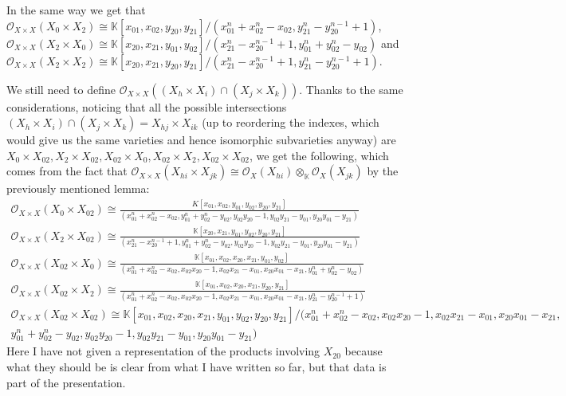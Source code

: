 \documentclass{article}
\newcommand{\numberset}{\mathbb}
\newcommand{\K}{\numberset{K}}
\begin{document}
In the same way we get that $\mathcal{O}_{X\times X}(X_0\times X_2)\cong\K[x_{01},x_{02},y_{20},y_{21}]/(x_{01}^n+x_{02}^n-x_{02},y_{21}^n-y_{20}^{n-1}+1)$, $\mathcal{O}_{X\times X}(X_2\times X_0)\cong\K[x_{20},x_{21},y_{01},y_{02}]/(x_{21}^n-x_{20}^{n-1}+1,y_{01}^n+y_{02}^n-y_{02})$ and $\mathcal{O}_{X\times X}(X_2\times X_2)\cong\K[x_{20},x_{21},y_{20},y_{21}]/(x_{21}^n-x_{20}^{n-1}+1,y_{21}^n-y_{20}^{n-1}+1)$.

We still need to define $\mathcal{O}_{X\times X}((X_h\times X_i)\cap(X_j\times X_k))$. Thanks to the same considerations, noticing that all the possible intersections $(X_h\times X_i)\cap(X_j\times X_k)=X_{hj}\times X_{ik}$ (up to reordering the indexes, which would give us the same varieties and hence isomorphic subvarieties anyway) are $X_0\times X_{02},X_2\times X_{02},X_{02}\times X_0,X_{02}\times X_2,X_{02}\times X_{02}$, we get the following, which comes from the fact that $\mathcal{O}_{X\times X}(X_{hi}\times X_{jk})\cong\mathcal{O}_X(X_{hi})\otimes_{\K}\mathcal{O}_X(X_{jk})$ by the previously mentioned lemma:
\begin{align*}
  \mathcal{O}_{X\times X}(X_0\times X_{02})\cong\frac{K[x_{01},x_{02},y_{01},y_{02},y_{20},y_{21}]}{(x_{01}^n+x_{02}^n-x_{02},y_{01}^n+y_{02}^n-y_{02},y_{02}y_{20}-1,y_{02}y_{21}-y_{01},y_{20}y_{01}-y_{21})} \\
  \mathcal{O}_{X\times X}(X_2\times X_{02})\cong\frac{\K[x_{20},x_{21},y_{01},y_{02},y_{20},y_{21}]}{(x_{21}^n-x_{20}^{n-1}+1,y_{01}^n+y_{02}^n-y_{02},y_{02}y_{20}-1,y_{02}y_{21}-y_{01},y_{20}y_{01}-y_{21})} \\
  \mathcal{O}_{X\times X}(X_{02}\times X_0)\cong\frac{\K[x_{01},x_{02},x_{20},x_{21},y_{01},y_{02}]}{(x_{01}^n+x_{02}^n-x_{02},x_{02}x_{20}-1,x_{02}x_{21}-x_{01},x_{20}x_{01}-x_{21},y_{01}^n+y_{02}^n-y_{02})} \\
  \mathcal{O}_{X\times X}(X_{02}\times X_2)\cong\frac{\K[x_{01},x_{02},x_{20},x_{21},y_{20},y_{21}]}{(x_{01}^n+x_{02}^n-x_{02},x_{02}x_{20}-1,x_{02}x_{21}-x_{01},x_{20}x_{01}-x_{21},y_{21}^n-y_{20}^{n-1}+1)} \\
  \mathcal{O}_{X\times X}(X_{02}\times X_{02})\cong\K[x_{01},x_{02},x_{20},x_{21},y_{01},y_{02},y_{20},y_{21}]/(x_{01}^n+x_{02}^n-x_{02},x_{02}x_{20}-1,x_{02}x_{21}-x_{01},x_{20}x_{01}-x_{21},\\ y_{01}^n+y_{02}^n-y_{02},y_{02}y_{20}-1,y_{02}y_{21}-y_{01},y_{20}y_{01}-y_{21})
\end{align*}
Here I have not given a representation of the products involving $X_{20}$ because what they should be is clear from what I have written so far, but that data is part of the presentation.
\end{document}
